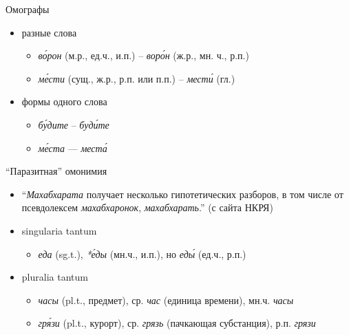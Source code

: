 \documentclass{beamer}
\begin{document}
\begin{frame}{Омографы}
\begin{itemize}
	\item разные слова
	    \begin{itemize}
	        \item \textit{в\'{о}рон} (м.р., ед.ч., и.п.) -- \textit{вор\'{о}н} (ж.р., мн. ч., р.п.)
	        \item \textit{м\'{е}сти} (сущ., ж.р., р.п. или п.п.) -- \textit{мест\'{и}} (гл.)
	    \end{itemize}
	\item формы одного слова
	    \begin{itemize}
	        \item \textit{б\'{у}дите} -- \textit{буд\'{и}те}
	        \item \textit{м\'{е}ста} — \textit{мест\'{а}}
	    \end{itemize}
\end{itemize}
\end{frame}

\begin{frame}{``Паразитная'' омонимия}
\begin{itemize}
	\item ``\textit{Махабхарата} получает несколько гипотетических разборов, в том числе от псевдолексем \textit{махабхаронок}, \textit{махабхарать}.'' (с сайта НКРЯ)
	\item singularia tantum
	    \begin{itemize}
	        \item \textit{еда} (sg.t.), \textit{*\'{е}ды} (мн.ч., и.п.), но \textit{ед\'{ы}} (ед.ч., р.п.)
	    \end{itemize}
	\item pluralia tantum
	    \begin{itemize}
	        \item \textit{часы} (pl.t., предмет), ср. \textit{час} (единица времени), мн.ч. \textit{часы}
	        \item \textit{гр\'{я}зи} (pl.t., курорт), ср. \textit{грязь} (пачкающая субстанция), р.п. \textit{грязи}
	    \end{itemize}
\end{itemize}
\end{frame}
\end{document}
